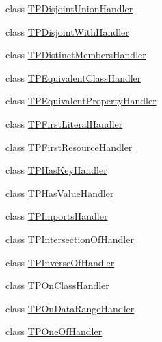 \begin{DoxyCompactItemize}
\item 
class \hyperlink{classorg_1_1coode_1_1owlapi_1_1rdfxml_1_1parser_1_1_t_p_disjoint_union_handler}{T\-P\-Disjoint\-Union\-Handler}
\item 
class \hyperlink{classorg_1_1coode_1_1owlapi_1_1rdfxml_1_1parser_1_1_t_p_disjoint_with_handler}{T\-P\-Disjoint\-With\-Handler}
\item 
class \hyperlink{classorg_1_1coode_1_1owlapi_1_1rdfxml_1_1parser_1_1_t_p_distinct_members_handler}{T\-P\-Distinct\-Members\-Handler}
\item 
class \hyperlink{classorg_1_1coode_1_1owlapi_1_1rdfxml_1_1parser_1_1_t_p_equivalent_class_handler}{T\-P\-Equivalent\-Class\-Handler}
\item 
class \hyperlink{classorg_1_1coode_1_1owlapi_1_1rdfxml_1_1parser_1_1_t_p_equivalent_property_handler}{T\-P\-Equivalent\-Property\-Handler}
\item 
class \hyperlink{classorg_1_1coode_1_1owlapi_1_1rdfxml_1_1parser_1_1_t_p_first_literal_handler}{T\-P\-First\-Literal\-Handler}
\item 
class \hyperlink{classorg_1_1coode_1_1owlapi_1_1rdfxml_1_1parser_1_1_t_p_first_resource_handler}{T\-P\-First\-Resource\-Handler}
\item 
class \hyperlink{classorg_1_1coode_1_1owlapi_1_1rdfxml_1_1parser_1_1_t_p_has_key_handler}{T\-P\-Has\-Key\-Handler}
\item 
class \hyperlink{classorg_1_1coode_1_1owlapi_1_1rdfxml_1_1parser_1_1_t_p_has_value_handler}{T\-P\-Has\-Value\-Handler}
\item 
class \hyperlink{classorg_1_1coode_1_1owlapi_1_1rdfxml_1_1parser_1_1_t_p_imports_handler}{T\-P\-Imports\-Handler}
\item 
class \hyperlink{classorg_1_1coode_1_1owlapi_1_1rdfxml_1_1parser_1_1_t_p_intersection_of_handler}{T\-P\-Intersection\-Of\-Handler}
\item 
class \hyperlink{classorg_1_1coode_1_1owlapi_1_1rdfxml_1_1parser_1_1_t_p_inverse_of_handler}{T\-P\-Inverse\-Of\-Handler}
\item 
class \hyperlink{classorg_1_1coode_1_1owlapi_1_1rdfxml_1_1parser_1_1_t_p_on_class_handler}{T\-P\-On\-Class\-Handler}
\item 
class \hyperlink{classorg_1_1coode_1_1owlapi_1_1rdfxml_1_1parser_1_1_t_p_on_data_range_handler}{T\-P\-On\-Data\-Range\-Handler}
\item 
class \hyperlink{classorg_1_1coode_1_1owlapi_1_1rdfxml_1_1parser_1_1_t_p_one_of_handler}{T\-P\-One\-Of\-Handler}
\item 

\end{DoxyCompactItemize}
